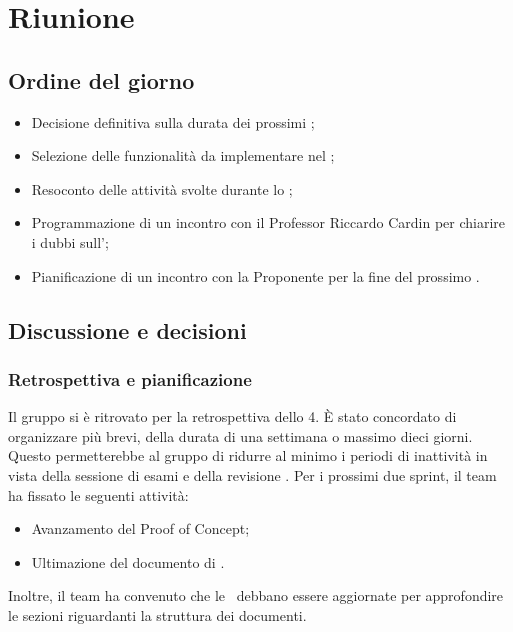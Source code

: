 \section{Riunione}
\subsection{Ordine del giorno}
\begin{itemize}
	\item Decisione definitiva sulla durata dei prossimi ;
	\item Selezione delle funzionalità da implementare nel ;
	\item Resoconto delle attività svolte durante lo ;
	\item Programmazione di un incontro con il Professor Riccardo Cardin per chiarire i dubbi sull'\AdR;
	\item Pianificazione di un incontro con la Proponente per la fine del prossimo .
\end{itemize}

\subsection{Discussione e decisioni}
\subsubsection{Retrospettiva e pianificazione}
\par Il gruppo si è ritrovato per la retrospettiva dello  4.
È stato concordato di organizzare  più brevi, della durata di una settimana o massimo dieci giorni.
Questo permetterebbe al gruppo di ridurre al minimo i periodi di inattività in vista della sessione di esami e della revisione .
Per i prossimi due sprint, il team ha fissato le seguenti attività:
\begin{itemize}
	\item Avanzamento del Proof of Concept;
	\item Ultimazione del documento di \AdR.
\end{itemize}

\vspace{0.5\baselineskip}
\par Inoltre, il team ha convenuto che le \NdP\ debbano essere aggiornate per approfondire le sezioni riguardanti la struttura dei documenti.

